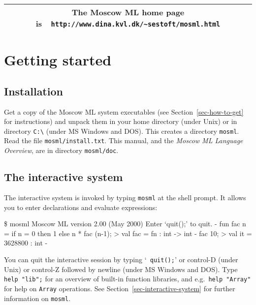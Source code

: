 \documentclass[fleqn]{article}
\begin{document}
\vfill

\begin{center}
\begin{tabular}{|c|}\hline
\rule[-0.4cm]{0cm}{1cm}The Moscow ML home page is\ \
    \verb$http://www.dina.kvl.dk/~sestoft/mosml.html$\\\hline
\end{tabular}
\end{center}

\vfill

\tableofcontents

\newpage

\section{Getting started}
\label{sec-getting-started}

\subsection{Installation}

Get a copy of the Moscow ML system executables (see
Section~\ref{sec-how-to-get} for instructions) and unpack them in your
home directory (under Unix) or in directory \verb#C:\# (under MS
Windows and DOS)\@.  This creates a directory {\tt mosml}.  Read the
file {\tt mosml/install.txt}.  This manual, and the {\em Moscow ML
  Language Overview\/}, are in directory {\tt mosml/doc}.


\subsection{The interactive system}

The interactive system is invoked by typing {\tt mosml} at the shell
prompt.  It allows you to enter declarations and evaluate expressions:

\begin{program}
\$ mosml
Moscow ML version 2.00 (May 2000)
Enter `quit();' to quit.
-  fun fac n = if n = 0 then 1 else n * fac (n-1);
> val fac = fn : int -> int
-  fac 10;
> val it = 3628800 : int
-
\end{program}

\noindent You can quit the interactive session by typing `{\tt
  quit();}' or control-D (under Unix) or control-Z followed by newline
(under MS Windows and DOS)\@.  Type {\tt help "lib";} for an overview
of built-in function libraries, and e.g.\ {\tt help "Array"} for help
on {\tt Array} operations.  See Section~\ref{sec-interactive-system}
for further information on {\tt mosml}.
\end{document}

